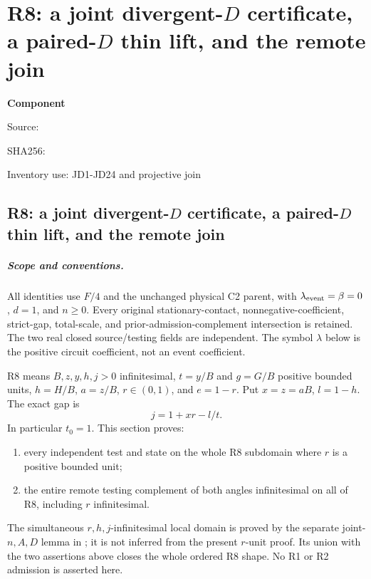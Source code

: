 \chapter{R8: a joint divergent-$D$ certificate, a paired-$D$ thin lift, and the remote join}
\label{component:pe07041e033da}
\noindent\textbf{Component }\par
{\small\noindent Source: \par}
{\small\noindent SHA256: \par}
{\small\noindent Inventory use: JD1-JD24 and projective join\par}
\medskip
\section{R8: a joint divergent-$D$ certificate, a paired-$D$ thin lift, and the remote join}
\label{pe07041e033da:sec:r17-R8-joint-D}

\paragraph{Scope and conventions.}
All identities use $F/4$ and the unchanged physical C2 parent, with
$\lambda_{\rm event}=\beta=0$, $d=1$, and $n\ge0$.  Every original
stationary-contact, nonnegative-coefficient, strict-gap, total-scale,
and prior-admission-complement intersection is retained.  The two real
closed source/testing fields are independent.  The symbol $\lambda$
below is the positive circuit coefficient, not an event coefficient.

R8 means $B,z,y,h,j>0$ infinitesimal, $t=y/B$ and $g=G/B$ positive
bounded units, $h=H/B$, $a=z/B$, $r\in(0,1)$, and $e=1-r$.  Put
$x=z=aB$, $l=1-h$.  The exact gap is
\[
                 j=1+xr-l/t.                         \tag{JD1}
\]
In particular $t_0=1$.  This section proves:
\begin{enumerate}
\item every independent test and state on the whole R8 subdomain
      where $r$ is a positive bounded unit;
\item the entire remote testing complement of both angles
      infinitesimal on all of R8, including $r$ infinitesimal.
\end{enumerate}
The simultaneous $r,h,j$-infinitesimal local domain is proved by the
separate joint-$n,A,D$ lemma in
; it is not
inferred from the present $r$-unit proof.  Its union with the two
assertions above closes the whole ordered R8 shape.  No R1 or R2
admission is asserted here.

